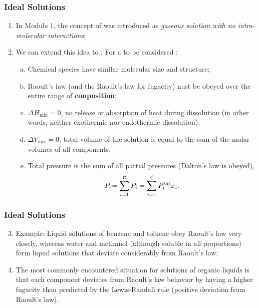 \documentclass[10pt,compress,handout,ignorenonframetext,unknownkeysallowed]{beamer}
\begin{document}
\begin{frame}
  \frametitle{Ideal Solutions}
        \begin{enumerate}%
           \item<1-> In Module 1, the concept of  was introduced as {\it gaseous solution with no intra-molecular interactions};
           \item<2-> We can extend this idea to . For a   to be considered : 
             \begin{enumerate}[a)]
                \item<3-> Chemical species have similar molecular size and structure;
                \item<4-> Raoult's law (and the Raoult's law for fugacity) nust be obeyed over the entire range of {\bf conposition};
                \item<5-> $\Delta H_{\text{mix}}=0$, \ie no release or absorption of heat during dissolution (in other words, neither exothermic nor endothermic dissolution);
                \item<6-> $\Delta V_{\text{mix}}=0$, \ie total volume of the solution is equal to the sum of the molar volumes of all components;
                \item<7-> Total pressure is the sum of all partial pressures (\ie Dalton's law is obeyed), \ie
                  \begin{displaymath}
                    P = \summation[P_{i}]{i=1}{\mathcal{C}} = \summation[P_{i}^{\text{sat}}x_{i}]{i=1}{\mathcal{C}}.
                  \end{displaymath}
             \end{enumerate}  
        \end{enumerate}
\end{frame}
\normalsize

\begin{frame}
  \frametitle{Ideal Solutions}
        \begin{enumerate}\setcounter{enumi}{2}  
           \item<1-> Example: Liquid solutions of benzene and toluene obey Raoult's law very closely, whereas water and methanol (although soluble in all proportions) form liquid solutions that deviate considerably from Raoult's law;
           \item<2-> The most commonly encountered situation for solutions of organic liquids is that each component deviates from Raoult's law behavior by having a higher fugacity than predicted by the Lewis-Randall rule (\ie positive deviation from Raoult's law).    
        \end{enumerate}
\end{frame}
\normalsize
\end{document}
